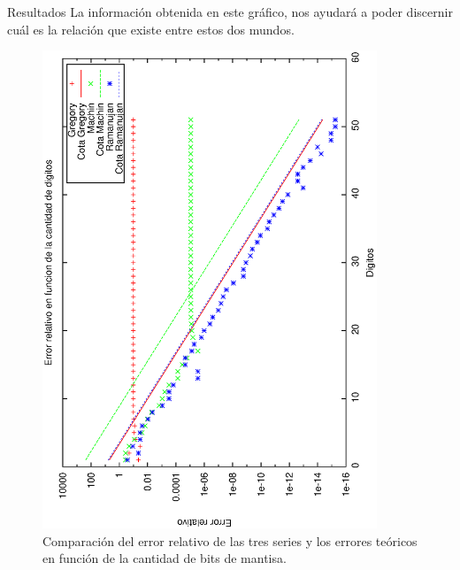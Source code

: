 \begin{section}{Resultados}
	La información obtenida en este gráfico, nos ayudará a poder discernir cuál es la relación que existe entre estos dos mundos.
	
	\begin{figure}[H]
	  \centering
		\includegraphics[width=10cm,angle=-90]{graficos/cotas.eps}
	  \caption{Comparación del error relativo de las tres series y los errores teóricos en función de la cantidad de bits de mantisa.}
	  \label{fig:cotas}
	\end{figure}
\end{section}

